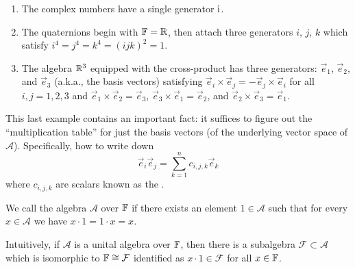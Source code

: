 \begin{example}
  \begin{enumerate}
  \item The complex numbers have a single generator $\mathrm{i}$.
  \item The quaternions begin with $\mathbb{F}=\mathbb{R}$, then attach three generators $i$,
$j$, $k$ which satisfy $i^{4}=j^{4}=k^{4}=(ijk)^{2}=1$.
  \item The algebra $\mathbb{R}^{3}$ equipped with the cross-product has three
    generators: $\vec{e}_{1}$, $\vec{e}_{2}$, and $\vec{e}_{3}$ (a.k.a.,
    the basis vectors) satisfying
    $\vec{e}_{i}\times\vec{e}_{j}=-\vec{e}_{j}\times \vec{e}_{i}$ for
    all $i,j=1,2,3$ and
    $\vec{e}_{1}\times\vec{e}_{2}=\vec{e}_{3}$,
    $\vec{e}_{3}\times\vec{e}_{1}=\vec{e}_{2}$, and
    $\vec{e}_{2}\times\vec{e}_{3}=\vec{e}_{1}$.
  \end{enumerate}
  This last example contains an important fact: it suffices to figure
  out the ``multiplication table'' for just the basis vectors (of the
  underlying vector space of $\mathcal{A}$). Specifically, how to write
  down
\begin{equation}
\vec{e}_{i}\vec{e}_{j} = \sum_{k=1}^{n}c_{i,j,k}\vec{e}_{k}
\end{equation}
where $c_{i,j,k}$ are scalars known as the .
\end{example}

\begin{definition}
We call the algebra $\mathcal{A}$ over $\mathbb{F}$  if there
exists an element $1\in\mathcal{A}$ such that for every
$x\in\mathcal{A}$ we have $x\cdot1=1\cdot x=x$.
\end{definition}

\begin{remark}
Intuitively, if $\mathcal{A}$ is a unital algebra over $\mathbb{F}$, then there
is a subalgebra $\mathcal{F}\subset\mathcal{A}$ which is isomorphic to $\mathbb{F}\cong\mathcal{F}$
identified as $x\cdot1\in\mathcal{F}$ for all $x\in\mathbb{F}$.
\end{remark}
